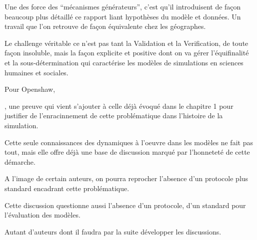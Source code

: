 
Une des force des \enquote{mécanismes générateurs}, c'est qu'il introduisent de façon beaucoup plus détaillé ce rapport liant hypothèses du modèle et données. Un travail que l'on retrouve de façon équivalente chez les géographes.

Le challenge véritable ce n'est pas tant la Validation et la Verification, de toute façon insoluble, mais la façon explicite et positive dont on va gérer l'équifinalité et la sous-détermination qui caractérise les modèles de simulations en sciences humaines et sociales.



Pour Openshaw, 

, une preuve qui vient s'ajouter à celle déjà évoqué dans le chapitre 1 pour justifier de l'enracinnement de cette problématique dans l'histoire de la simulation.



Cette seule connaissances des dynamiques à l'oeuvre dans les modèles ne fait pas tout, mais elle offre déjà une base de discussion marqué par l'honneteté de cette démarche.

A l'image de certain auteurs, on pourra reprocher l'absence d'un protocole plus standard encadrant cette problématique. 

Cette discussion questionne aussi l'absence d'un protocole, d'un standard pour l'évaluation des modèles. %

Autant d'auteurs \autocite{Richiardi2006} \autocite[198]{Fagiolo2007} \autocite{Moss2008} \autocite{Windrum2007} \autocite{Barlas1996} \autocite{Amblard2003} \autocite{OSullivan2004} \autocite{Doran2000} \autocite{Crooks2012} \autocite{Rouchier2013} dont il faudra par la suite développer les discussions.  




